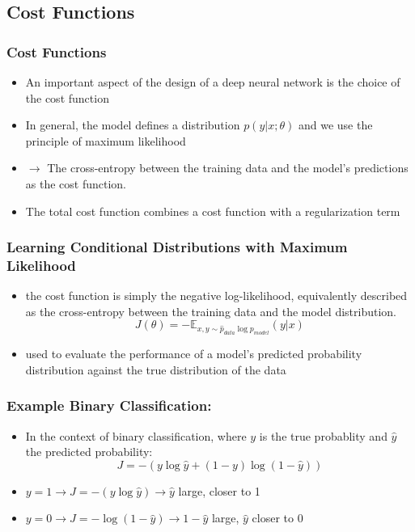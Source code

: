 \documentclass{beamer}
\begin{document}
\subsection{Cost Functions}
\begin{frame}
	\frametitle{Cost Functions}
	\begin{itemize}
		\item An important aspect of the design of a deep neural network is the choice of the cost function
			\pause
		\item In general, the model defines a distribution $p(y|x;\theta)$ and we use the principle of maximum likelihood
		\item $\rightarrow$ The cross-entropy between the training data and the model's predictions as the cost function.
			\pause
		\item The total cost function combines a cost function with a regularization term
	\end{itemize}
\end{frame}
\begin{frame}
	\frametitle{Learning Conditional Distributions with Maximum Likelihood}
	\begin{itemize}
		\item the cost function is simply the negative log-likelihood, equivalently described as the cross-entropy between the training data and the model distribution.
			$$ J(\theta)= -\mathbb{E}_{x,y\sim \hat{p}_{data}\log p_{model}}(y|x)$$
			\pause
		\item used to evaluate the performance of a model's predicted probability distribution against the true distribution of the data
	\end{itemize}	
\end{frame}
\begin{frame}
	\frametitle{Example Binary Classification:}
	\begin{itemize}
\item In the context of binary classification, where $y$ is the true probablity and $\hat{y}$ the predicted probability:
			$$ J = -(y\log \hat{y} + (1-y) \log (1- \hat{y}))$$
			\pause
		\item $y = 1 \rightarrow J =-(y\log \hat{y}) \rightarrow \hat{y}$ large, closer to 1
			\pause
		\item $y = 0 \rightarrow J =-\log (1-\hat{y}) \rightarrow 1- \hat{y}$ large, $\hat{y}$ closer to 0
		
	\end{itemize}
	
\end{frame}
\end{document}
